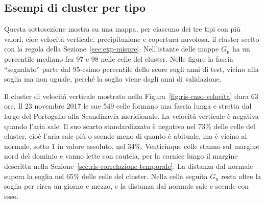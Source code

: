 \subsection{Esempi di cluster per tipo}
\label{sec:ris-esempi}

Questa sottosezione mostra su una mappa, per ciascuno dei tre tipi con più valori, cioè velocità verticale, precipitazione e copertura nuvolosa, il cluster scelto con la regola della Sezione~\ref{sec:exp-misure}. Nell'istante delle mappe $G_{\mathrm{n}}$ ha un percentile mediano fra 97 e 98 nelle celle del cluster. Nelle figure la fascia ``segnalato'' parte dal 95-esimo percentile dello score sugli anni di test, vicino alla soglia ma non uguale, perché la soglia viene dagli anni di validazione.

Il cluster di velocità verticale mostrato nella Figura~\ref{fig:ris-caso-velocita} dura 63 ore. Il 23 novembre 2017 le sue 549 celle formano una fascia lunga e stretta dal largo del Portogallo alla Scandinavia meridionale. La velocità verticale è negativa quando l'aria sale. Il suo scarto standardizzato è negativo nel 73\% delle celle del cluster, cioè l'aria sale più o scende meno di quanto è abituale, ma è vicino al normale, sotto 1 in valore assoluto, nel 34\%. Venticinque celle stanno sul margine nord del dominio e vanno lette con cautela, per la cornice lungo il margine descritta nella Sezione~\ref{sec:ris-correlazione-temporale}. La distanza dal normale supera la soglia nel 65\% delle celle del cluster. Nella cella seguita $G_{\mathrm{n}}$ resta oltre la soglia per circa un giorno e mezzo, e la distanza dal normale sale e scende con esso.


